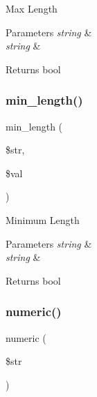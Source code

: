 Max Length


\begin{DoxyParams}{Parameters}
{\em string} & \\
\hline
{\em string} & \\
\hline
\end{DoxyParams}
\begin{DoxyReturn}{Returns}
bool 
\end{DoxyReturn}
\mbox{\label{class_c_i___form__validation_a63a166f35fed88ec433fd2a37ec5ae90}} 
\subsubsection{\texorpdfstring{min\+\_\+length()}{min\_length()}}
{\footnotesize\ttfamily min\+\_\+length (\begin{DoxyParamCaption}\item[{}]{\$str,  }\item[{}]{\$val }\end{DoxyParamCaption})}

Minimum Length


\begin{DoxyParams}{Parameters}
{\em string} & \\
\hline
{\em string} & \\
\hline
\end{DoxyParams}
\begin{DoxyReturn}{Returns}
bool 
\end{DoxyReturn}
\mbox{\label{class_c_i___form__validation_a058a2b065a28a929956630238d5bf5bb}} 
\subsubsection{\texorpdfstring{numeric()}{numeric()}}
{\footnotesize\ttfamily numeric (\begin{DoxyParamCaption}\item[{}]{\$str }\end{DoxyParamCaption})}

